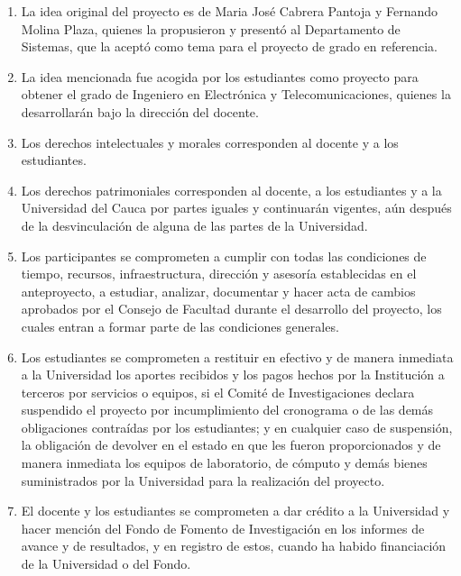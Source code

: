 \begin{enumerate}
    \item La idea original del proyecto es de Maria José Cabrera Pantoja y Fernando Molina Plaza, quienes la propusieron y presentó al Departamento de Sistemas, que la aceptó como tema para el proyecto de grado en referencia. \\
    \item La idea mencionada fue acogida por los estudiantes como proyecto para obtener el grado de Ingeniero en Electrónica y Telecomunicaciones, quienes la desarrollarán bajo la dirección del docente. \\
    \item Los derechos intelectuales y morales corresponden al docente y a los estudiantes. \\
    \item Los derechos patrimoniales corresponden al docente, a los estudiantes y a la Universidad del Cauca por partes iguales y continuarán vigentes, aún después de la desvinculación de alguna de las partes de la Universidad. \\
    \item Los participantes se comprometen a cumplir con todas las condiciones de tiempo, recursos, infraestructura, dirección y asesoría establecidas en el anteproyecto, a estudiar, analizar, documentar y hacer acta de cambios aprobados por el Consejo de Facultad durante el desarrollo del proyecto, los cuales entran a formar parte de las condiciones generales. \\
    \item Los estudiantes se comprometen a restituir en efectivo y de manera inmediata a la Universidad los aportes recibidos y los pagos hechos por la Institución a terceros por servicios o equipos, si el Comité de Investigaciones declara suspendido el proyecto por incumplimiento del cronograma o de las demás obligaciones contraídas por los estudiantes; y en cualquier caso de suspensión, la obligación de devolver en el estado en que les fueron proporcionados y de manera inmediata los equipos de laboratorio, de cómputo y demás bienes suministrados por la Universidad para la realización del proyecto. \\
    \item El docente y los estudiantes se comprometen a dar crédito a la Universidad y hacer mención del Fondo de Fomento de Investigación en los informes de avance y de resultados, y en registro de estos, cuando ha habido financiación de la Universidad o del Fondo. \\

\end{enumerate}
